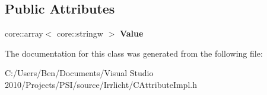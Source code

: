 \subsection*{Public Attributes}
\begin{DoxyCompactItemize}
\item 
\hypertarget{classirr_1_1io_1_1_c_string_w_array_attribute_a37c1e4e96fa0e3e94074ed207ba2d3a7}{core\-::array$<$ core\-::stringw $>$ {\bfseries Value}}\label{classirr_1_1io_1_1_c_string_w_array_attribute_a37c1e4e96fa0e3e94074ed207ba2d3a7}

\end{DoxyCompactItemize}


The documentation for this class was generated from the following file\-:\begin{DoxyCompactItemize}
\item 
C\-:/\-Users/\-Ben/\-Documents/\-Visual Studio 2010/\-Projects/\-P\-S\-I/source/\-Irrlicht/C\-Attribute\-Impl.\-h\end{DoxyCompactItemize}
